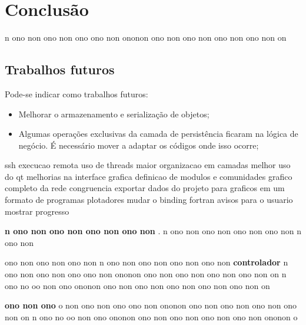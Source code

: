 \chapter{Conclusão} \label{cap:conclusao}

n ono non ono non ono ono non ononon ono non ono non ono non ono non on

\section{Trabalhos futuros}

Pode-se indicar como trabalhos futuros:

\begin{itemize}
  \item{Melhorar o armazenamento e serialização de objetos;}
  \item{Algumas operações exclusivas da camada de persistência ficaram na lógica de negócio. É necessário mover a adaptar os códigos onde isso ocorre;}
\end{itemize}

ssh execucao remota
uso de threads
maior organizacao em camadas
melhor uso do qt
melhorias na interface grafica
definicao de modulos e comunidades
grafico completo da rede
congruencia
exportar dados do projeto para graficos em um formato de programas plotadores
mudar o binding fortran
avisos para o usuario
mostrar progresso

\textbf{n ono non ono non ono non ono non }.
n ono non ono non ono non ono non n ono non 

ono non ono non ono non n ono non ono non ono non ono non 
\textbf{controlador} n ono non ono non ono ono non ononon ono non ono non ono non ono non on
n ono no oo non ono ononon ono  non ono non ono non ono non ono non on

\textbf{ono non ono}
o non ono non ono ono non ononon ono non ono non ono non ono non on
n ono no oo non ono ononon ono  non ono non ono non ono non ononon o 

